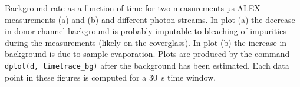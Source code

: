 \label{fig:bg_timetrace} Background rate as a function of time for two measurements µs-ALEX measurements (a) and (b) 
and different photon streams. In plot (a) the decrease in donor channel background is probably imputable to bleaching of impurities during the measurements (likely on the coverglass). In plot (b) the increase in background is due to sample evaporation. Plots are produced by the command
\texttt{dplot(d, timetrace\_bg)} after the background has been estimated. Each data point in these figures is computed for a 30~s time window.